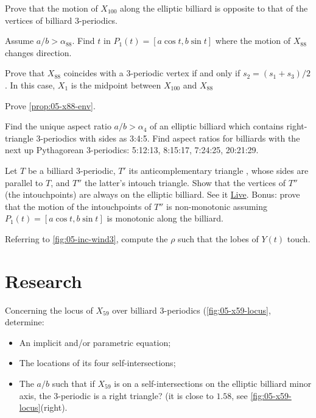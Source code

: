 \begin{exercise}
Prove that the motion of $X_{100}$ along the elliptic billiard is opposite to that of the vertices of billiard 3-periodics.
\label{exe:05-x100}
\end{exercise}

\begin{exercise}
Assume $a/b>\alpha_{88}$. Find $t$ in $P_1(t)=[a\cos{t},b\sin{t}]$ where the motion of $X_{88}$ changes direction.
\end{exercise}

\begin{exercise}
Prove that $X_{88}$ coincides with a 3-periodic vertex if and only if $s_2 = (s_1+s_3)/2$. In this case, $X_1$ is the midpoint between $X_{100}$ and $X_{88}$ 
\end{exercise}

\begin{exercise}
Prove \cref{prop:05-x88-env}.
\end{exercise}

\begin{exercise}
Find the unique aspect ratio $a/b>\alpha_4$ of an elliptic billiard which contains right-triangle 3-periodics with sides as 3:4:5. Find aspect ratios for billiards with the next up Pythagorean 3-periodics: 5:12:13, 8:15:17, 7:24:25, 20:21:29. 
\end{exercise}

\begin{exercise}
Let $T$ be a billiard 3-periodic, $T'$ its anticomplementary triangle \cite{mw}, whose sides are parallel to $T$, and $T''$ the latter's intouch triangle. Show that the vertices of $T''$ (the intouchpoints) are always on the elliptic billiard. See it \href{https://bit.ly/3vbk7yu}{Live}. Bonus: prove that the motion of the intouchpoints of $T''$ is non-monotonic assuming $P_1(t)=[a\cos{t},b\sin{t}]$ is monotonic along the billiard. 
\end{exercise}

\begin{exercise}
\label{ex:05-wind}
Referring to \cref{fig:05-inc-wind3}, compute the $\rho$ such that the lobes of $Y(t)$ touch.
\end{exercise}

\section{Research}

\begin{question}
Concerning the locus of $X_{59}$ over billiard 3-periodics (\cref{fig:05-x59-locus}, determine:
\begin{itemize}
\item An implicit and/or parametric equation;
\item The locations of its four self-intersections;
\item The $a/b$ such that if $X_{59}$ is on a self-intersections on the elliptic billiard minor axis, the 3-periodic is a right triangle? (it is close to $1.58$, see \cref{fig:05-x59-locus}(right).
\end{itemize}
\end{question}

